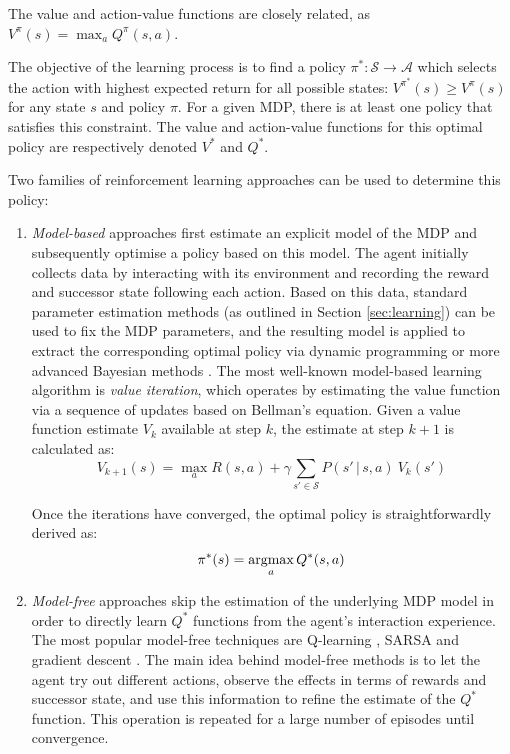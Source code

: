 The value and action-value functions are closely related, as $V^{\pi}(s) = \max_a Q^{\pi}(s,a)$.

The objective of the learning process is to find a policy $\pi^*: \mathcal{S} \rightarrow \mathcal{A}$ which selects the action with highest expected return for all possible states: $V^{\pi^*}(s) \geq V^{\pi}(s)$ for any state $s$ and policy $\pi$.  For a given MDP, there is at least one policy that satisfies this constraint. The value and action-value functions for this optimal policy are respectively denoted $V^*$ and $Q^*$. 

Two families of reinforcement learning approaches can be used to determine this policy: \begin{enumerate}
\item  \textit{Model-based} approaches first estimate an explicit model of the MDP and subsequently optimise a policy based on this model. The agent initially collects data by interacting with its environment and recording the reward and successor state following each action. Based on this data, standard parameter estimation methods (as outlined in Section \ref{sec:learning}) can be used to fix the MDP parameters, and the resulting model is  applied to extract the corresponding optimal policy via dynamic programming \citep{Bertsekas:1996} or more advanced Bayesian methods \citep{DeardenFA99}.  The most well-known model-based learning algorithm is \textit{value iteration}, which operates by estimating the value function via a sequence of updates based on Bellman's equation. Given a value function estimate $V_k$ available at step $k$, the estimate at step $k+1$ is calculated as: 
\begin{equation}
V_{k+1}(s) = \max_a R(s,a) + \gamma \sum_{s' \in \mathcal{S}} P(s' \, | \, s, a) \ V_k(s')
\end{equation}

Once the iterations have converged, the optimal policy is straightforwardly derived as:
\begin{equation}
\pi^*(s) = \argmax_a Q^*(s,a)
\end{equation}

\item \textit{Model-free} approaches skip the estimation of the underlying MDP model in order to directly learn $Q^*$ functions from the agent's interaction experience.  The most popular model-free techniques are Q-learning \citep{watkins92}, SARSA \citep{rummery:phd95} and gradient descent \citep{Sutton:2009}.  The main idea behind model-free methods is to let the agent try out different actions, observe the effects in terms of rewards and successor state, and use this information to refine the estimate of the $Q^*$ function. This operation is repeated for a large number of episodes until convergence.  
\end{enumerate}

